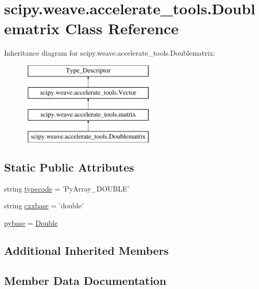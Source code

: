 \hypertarget{classscipy_1_1weave_1_1accelerate__tools_1_1Doublematrix}{}\section{scipy.\+weave.\+accelerate\+\_\+tools.\+Doublematrix Class Reference}
\label{classscipy_1_1weave_1_1accelerate__tools_1_1Doublematrix}
Inheritance diagram for scipy.\+weave.\+accelerate\+\_\+tools.\+Doublematrix\+:\begin{figure}[H]
\begin{center}
\leavevmode
\includegraphics[height=4.000000cm]{classscipy_1_1weave_1_1accelerate__tools_1_1Doublematrix}
\end{center}
\end{figure}
\subsection*{Static Public Attributes}
\begin{DoxyCompactItemize}
\item 
string \hyperlink{classscipy_1_1weave_1_1accelerate__tools_1_1Doublematrix_a593514311f286e9e00262508e33678f1}{typecode} = 'Py\+Array\+\_\+\+D\+O\+U\+B\+L\+E'
\item 
string \hyperlink{classscipy_1_1weave_1_1accelerate__tools_1_1Doublematrix_add9e64b58e6df82974943be52faf75d6}{cxxbase} = 'double'
\item 
\hyperlink{classscipy_1_1weave_1_1accelerate__tools_1_1Doublematrix_ab802752d039c36dd548c4b7f0f875fe5}{pybase} = \hyperlink{classscipy_1_1weave_1_1accelerate__tools_1_1Double}{Double}
\end{DoxyCompactItemize}
\subsection*{Additional Inherited Members}


\subsection{Member Data Documentation}
\hypertarget{classscipy_1_1weave_1_1accelerate__tools_1_1Doublematrix_add9e64b58e6df82974943be52faf75d6}{}
